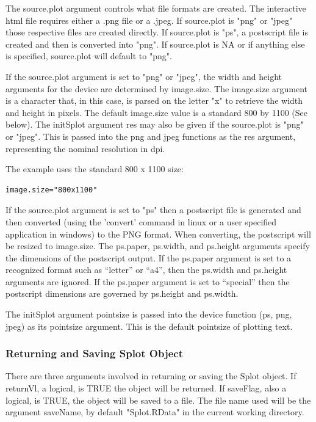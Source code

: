 \documentclass[]{article}
\begin{document}
\indent The source.plot argument controls what file formats are created. The interactive html file requires either a .png file or a .jpeg. If source.plot is  "png" or "jpeg" those respective files are created directly. If source.plot is "ps", a postscript file is created and then is converted into "png". If source.plot is NA or if anything else is specified, source.plot will default to "png". \newline

\indent If the source.plot argument is set to "png" or "jpeg", the width and height arguments for the device are determined by image.size. The image.size argument is a character that, in this case, is parsed on the letter "x" to retrieve the width and height in pixels. The default image.size value is a standard 800 by 1100 (See below). The initSplot argument res may also be given if the source.plot is "png" or "jpeg". This is passed into the png and jpeg functions as the res argument, representing the nominal resolution in dpi.  \newline

\indent The example uses the standard 800 x 1100 size:
\begin{verbatim}
image.size="800x1100"
\end{verbatim}

\indent If the source.plot argument is set to "ps" then a postscript file is generated and then converted (using the 'convert' command in linux or a user specified application in windows) to the PNG format. When converting, the postscript will be resized to image.size. The ps.paper, ps.width, and ps.height arguments specify the dimensions of the postscript output. If the ps.paper argument is set to a recognized format such as ``letter'' or ``a4'', then the ps.width and ps.height arguments are ignored. If the ps.paper argument is set to ``special'' then the postscript dimensions are governed by ps.height and ps.width.  \newline

\indent The initSplot argument pointsize is passed into the device function (ps, png, jpeg) as its pointsize argument. This is the default pointsize of plotting text.  

\subsubsection{Returning and Saving Splot Object}

\indent There are three arguments involved in returning or saving the Splot object. If returnVl, a logical, is TRUE the object will be returned. If saveFlag, also a logical, is TRUE, the object will be saved to a file. The file name used will be the argument saveName, by default "Splot.RData" in the current working directory. 
\end{document}
